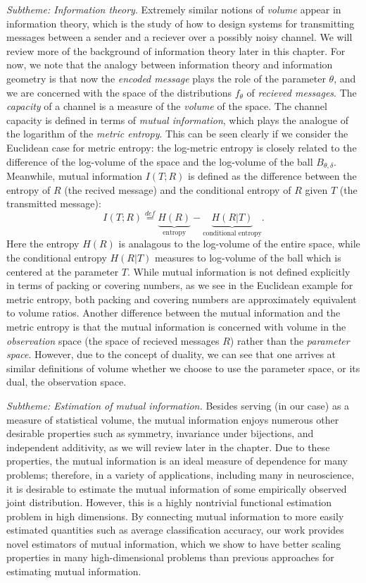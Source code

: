 \emph{Subtheme: Information theory}.  Extremely similar notions of
\emph{volume} appear in information theory, which is the study of how
to design systems for transmitting messages between a sender and a
reciever over a possibly noisy channel.  We will review more of the
background of information theory later in this chapter.  For now, we
note that the analogy between information theory and information
geometry is that now the \emph{encoded message} plays the role of the
parameter $\theta$, and we are concerned with the space of the
distributions $f_\theta$ of \emph{recieved messages}.  The
\emph{capacity} of a channel is a measure of the \emph{volume} of the
space.  The channel capacity is defined in terms of \emph{mutual
  information}, which plays the analogue of the logarithm of the
\emph{metric entropy}.  This can be seen clearly if we consider the
Euclidean case for metric entropy: the log-metric entropy is closely
related to the difference of the log-volume of the space and the
log-volume of the ball $B_{\theta, \delta}$.  Meanwhile, mutual
information $I(T; R)$ is defined as the difference between the entropy of $R$ (the recived message)
and the conditional entropy of $R$ given $T$ (the transmitted message):
\[
I(T; R) \stackrel{def}{=} \underbrace{H(R)}_{\text{entropy}} - \underbrace{H(R|T)}_{\text{conditional entropy}}.
\]
Here the entropy $H(R)$ is analagous to the log-volume of the entire
space, while the conditional entropy $H(R|T)$ measures to log-volume
of the ball which is centered at the parameter $T$.  While mutual
information is not defined explicitly in terms of packing or covering
numbers, as we see in the Euclidean example for metric entropy, both
packing and covering numbers are approximately equivalent to volume
ratios.  Another difference between the mutual information and the
metric entropy is that the mutual information is concerned with volume
in the \emph{observation} space (the space of recieved messages $R$)
rather than the \emph{parameter space}.  However, due to the concept
of duality, we can see that one arrives at similar definitions of
volume whether we choose to use the parameter space, or its dual, the
observation space.

\emph{Subtheme: Estimation of mutual information.}  Besides serving
(in our case) as a measure of statistical volume, the mutual
information enjoys numerous other desirable properties such as
symmetry, invariance under bijections, and independent additivity, as
we will review later in the chapter.  Due to these properties, the
mutual information is an ideal measure of dependence for many
problems; therefore, in a variety of applications, including many in
neuroscience, it is desirable to estimate the mutual information of
some empirically observed joint distribution.  However, this is a
highly nontrivial functional estimation problem in high dimensions.
By connecting mutual information to more easily estimated quantities
such as average classification accuracy, our work provides novel
estimators of mutual information, which we show to have better scaling
properties in many high-dimensional problems than previous approaches
for estimating mutual information.

